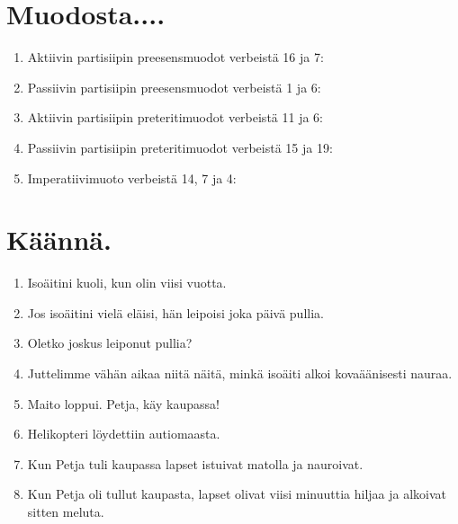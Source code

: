 \documentclass[paper=a4, fontsize=11pt]{scrartcl}
\begin{document}

\section{Muodosta....}

\begin{enumerate}
    \item Aktiivin partisiipin preesensmuodot verbeistä 16 ja 7:  \underline{\hspace{8cm}}
    \item Passiivin partisiipin preesensmuodot verbeistä 1 ja 6:  \underline{\hspace{8cm}}
    \item Aktiivin partisiipin preteritimuodot verbeistä 11 ja 6:  \underline{\hspace{8cm}}
    \item Passiivin partisiipin preteritimuodot verbeistä 15 ja 19:  \underline{\hspace{8cm}}
    \item Imperatiivimuoto verbeistä 14, 7 ja 4:  \underline{\hspace{8cm}}
\end{enumerate}

\section{Käännä.}

\begin{enumerate}
    \item Isoäitini kuoli, kun olin viisi vuotta. \\ \underline{\hspace{12cm}}
    \item Jos isoäitini vielä eläisi, hän leipoisi joka päivä pullia. \\ \underline{\hspace{12cm}}
    \item Oletko joskus leiponut pullia? \\ \underline{\hspace{12cm}}
    \item Juttelimme vähän aikaa niitä näitä, minkä isoäiti alkoi kovaäänisesti nauraa.  \\ \underline{\hspace{12cm}}
    \item Maito loppui. Petja, käy kaupassa! \\ \underline{\hspace{12cm}}
    \item Helikopteri löydettiin autiomaasta. \\ \underline{\hspace{12cm}}
    \item Kun Petja tuli kaupassa lapset istuivat matolla ja nauroivat. \\ \underline{\hspace{12cm}}
    \item Kun Petja oli tullut kaupasta, lapset olivat viisi minuuttia hiljaa ja alkoivat sitten meluta. \\ \underline{\hspace{12cm}}
\end{enumerate}
\end{document}
